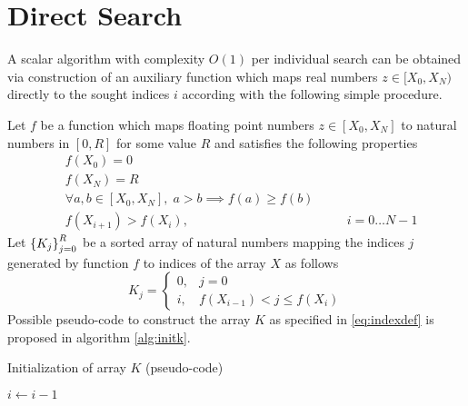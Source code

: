 \documentclass[preprint,1p,times]{elsarticle}
\begin{document}
\section{Direct Search}
\label{sec:directmethod}
A scalar algorithm with complexity $O(1)$ per individual search can be obtained via construction of an auxiliary function which maps real numbers $z\in[X_{0},X_{N})$ directly to the sought indices $i$ according with the following simple procedure.

Let $f$ be a function which maps floating point numbers $z\in[X_{0},X_{N}]$ to natural numbers in $[0,R]$ for some value $R$ and satisfies the following properties
\begin{subequations}
\label{eq:fprop}
\begin{align}
&f(X_0)=0 \\
&f(X_N)=R \label{eq:lastf} \\
&\forall a,b \in[X_{0},X_{N}], \; a>b \implies f(a) \geq f(b) \label{eq:monotonic} \\
&f(X_{i+1}) > f(X_i), &&\quad  i=0 \dots N-1 \label{eq:f-monotonic}
\end{align}
\end{subequations}
Let $\left \{ K_j \right \}_{j=0}^R$ be a sorted array of natural numbers mapping the indices $j$ generated by function $f$ to indices of the array $X$ as follows
\begin{equation}
\label{eq:indexdef}
K_{j}=\left\{ 
	\begin{array}{ll}
		0, & j=0 \\
		i, & f(X_{i-1}) < j \leq f(X_i)
	\end{array}
\right.
\end{equation}
Possible pseudo-code to construct the array $K$ as specified in \eqref{eq:indexdef} is proposed in algorithm \eqref{alg:initk}.
\begin{algorithm}
	\caption{Initialization of array $K$ (pseudo-code)}
	\label{alg:initk}
	\begin{algorithmic}
		  
		\EndWhile
		 
		\EndIf
		
		\State $i \leftarrow i-1$
		\EndWhile
		\EndFunction
	\end{algorithmic}
\end{algorithm}
\end{document}
